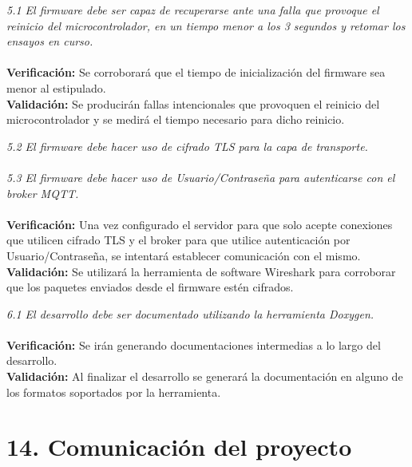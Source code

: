 \documentclass[11pt]{charter}
\begin{document}
\begin{tcolorbox}	
	\textit{5.1 El firmware debe ser capaz de recuperarse ante una falla que provoque el reinicio del microcontrolador, en un tiempo menor a los 3 segundos y retomar los ensayos en curso.} \\ \\
	\textbf{Verificación:} Se corroborará que el tiempo de inicialización del firmware sea menor al estipulado. \\
	\textbf{Validación:} Se producirán fallas intencionales que provoquen el reinicio del microcontrolador y se medirá el tiempo necesario para dicho reinicio.\\
\end{tcolorbox}	

\begin{tcolorbox}	
	\textit{5.2 El firmware debe hacer uso de cifrado TLS para la capa de transporte.} \\ \\
	\textit{5.3 El firmware debe hacer uso de Usuario/Contraseña para autenticarse con el broker MQTT.} \\ \\
	\textbf{Verificación:} Una vez configurado el servidor para que solo acepte conexiones que utilicen cifrado TLS y el broker para que utilice autenticación por Usuario/Contraseña, se intentará establecer comunicación con el mismo. \\
	\textbf{Validación:} Se utilizará la herramienta de software Wireshark para corroborar que los paquetes enviados desde el firmware estén cifrados. \\
\end{tcolorbox}
	
\begin{tcolorbox}
	\textit{6.1 El desarrollo debe ser documentado utilizando la herramienta Doxygen.} \\ \\
	\textbf{Verificación:} Se irán generando documentaciones intermedias a lo largo del desarrollo. \\
	\textbf{Validación:} Al finalizar el desarrollo se generará la documentación en alguno de los formatos soportados por la herramienta. \\
\end{tcolorbox}


\section{14. Comunicación del proyecto}
\label{sec:comunicaciones}
\end{document}
